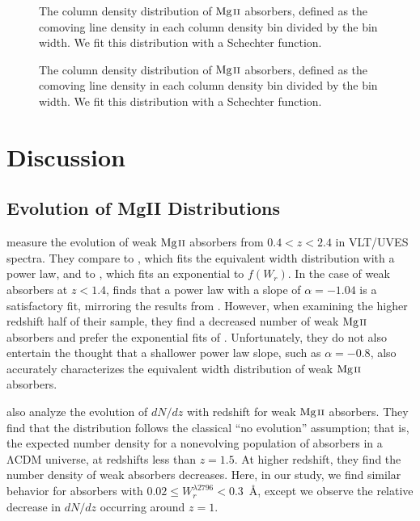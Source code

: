 \documentclass[iop,apj,numberedappendix,appendixfloats,twocolappendix]{emulateapj}
\begin{document}
\begin{figure*}[bth]
\caption{The column density distribution of ${\hbox{{\rm Mg}\kern 0.1em{\sc ii}}}$ absorbers, defined as the comoving line density in each column density bin divided by the bin width. We fit this distribution with a Schechter function.}
\label{fig:logndistrodndz}
\end{figure*}

\begin{figure*}[bth]
\caption{The column density distribution of ${\hbox{{\rm Mg}\kern 0.1em{\sc ii}}}$ absorbers, defined as the comoving line density in each column density bin divided by the bin width. We fit this distribution with a Schechter function.}
\label{fig:logndistrodndx}
\end{figure*}


\section{Discussion}
\label{sec:discussion}

\subsection{Evolution of MgII Distributions}

\cite{Narayanan2007} measure the evolution of weak ${\hbox{{\rm Mg}\kern 0.1em{\sc ii}}}$ absorbers from $0.4 < z < 2.4$ in VLT/UVES spectra. They compare to \cite{Churchill1999}, which fits the equivalent width distribution with a power law, and to \cite{Nestor2005}, which fits an exponential to $f(W_r)$. In the case of weak absorbers at $z < 1.4$, \cite{Narayanan2007} finds that a power law with a slope of $\alpha = -1.04$ is a satisfactory fit, mirroring the results from \cite{Churchill1999}. However, when examining the higher redshift half of their sample, they find a decreased number of weak ${\hbox{{\rm Mg}\kern 0.1em{\sc ii}}}$ absorbers and prefer the exponential fits of \cite{Nestor2005}. Unfortunately, they do not also entertain the thought that a shallower power law slope, such as $\alpha = -0.8$, also accurately characterizes the equivalent width distribution of weak ${\hbox{{\rm Mg}\kern 0.1em{\sc ii}}}$ absorbers. 

\cite{Narayanan2007} also analyze the evolution of $dN\!/dz$ with redshift for weak ${\hbox{{\rm Mg}\kern 0.1em{\sc ii}}}$ absorbers. They find that the distribution follows the classical ``no evolution'' assumption; that is, the expected number density for a nonevolving population of absorbers in a $\mathrm{\Lambda CDM}$ universe, at redshifts less than $z = 1.5$. At higher redshift, they find the number density of weak absorbers decreases. Here, in our study, we find similar behavior for absorbers with $0.02 \le W_r^{\lambda2796} < 0.3$~{\AA}, except we observe the relative decrease in $dN\!/dz$ occurring around $z = 1$.
\end{document}
